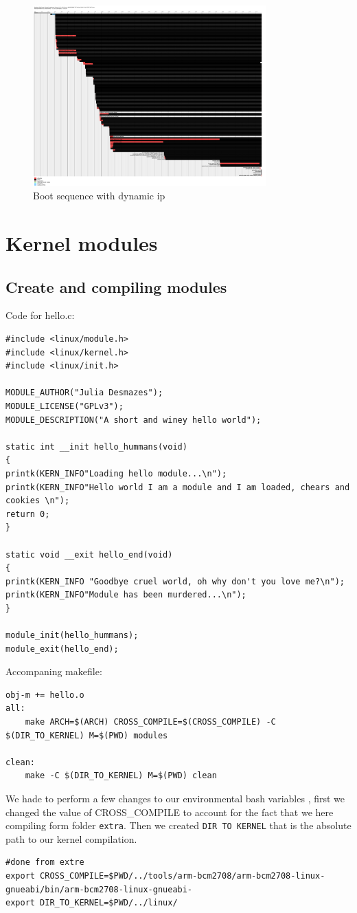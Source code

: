 \documentclass[a4paper,oneside,onecolumn]{article}
\newcommand{\code}[1]{\colorbox{codegray}{\texttt{#1}}}
\begin{document}
\begin{figure}[!h]
	\centering
	\includegraphics[width=0.8\textwidth,natwidth=610,natheight=642]{Resources/bootdyn.png}
	\caption{Boot sequence with dynamic ip}
\end{figure}
\section{Kernel modules}
\subsection{Create and compiling modules}
Code for hello.c:
\begin{lstlisting}
#include <linux/module.h>       
#include <linux/kernel.h>  
#include <linux/init.h>   

MODULE_AUTHOR("Julia Desmazes");
MODULE_LICENSE("GPLv3");
MODULE_DESCRIPTION("A short and winey hello world");

static int __init hello_hummans(void)
{
printk(KERN_INFO"Loading hello module...\n");
printk(KERN_INFO"Hello world I am a module and I am loaded, chears and cookies \n");
return 0;
}

static void __exit hello_end(void)
{
printk(KERN_INFO "Goodbye cruel world, oh why don't you love me?\n");
printk(KERN_INFO"Module has been murdered...\n");
}

module_init(hello_hummans);
module_exit(hello_end);
\end{lstlisting}
Accompaning makefile:
\begin{lstlisting}
obj-m += hello.o
all:
	make ARCH=$(ARCH) CROSS_COMPILE=$(CROSS_COMPILE) -C $(DIR_TO_KERNEL) M=$(PWD) modules

clean:
	make -C $(DIR_TO_KERNEL) M=$(PWD) clean
\end{lstlisting}
We hade to perform a few changes to our environmental bash variables , first we changed the value of CROSS\_COMPILE to account for the fact that we here compiling form folder \texttt{extra}. Then we created \code{DIR TO KERNEL} that is the absolute path to our kernel compilation.
\begin{lstlisting}
#done from extre
export CROSS_COMPILE=$PWD/../tools/arm-bcm2708/arm-bcm2708-linux-gnueabi/bin/arm-bcm2708-linux-gnueabi-
export DIR_TO_KERNEL=$PWD/../linux/
\end{lstlisting}
\end{document}
